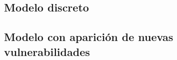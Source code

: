 \documentclass[11pt,a4paper]{article}
\begin{document}

% 

% 

\subsection{Modelo discreto}



\subsection{Modelo con aparición de nuevas vulnerabilidades}



\end{document}
